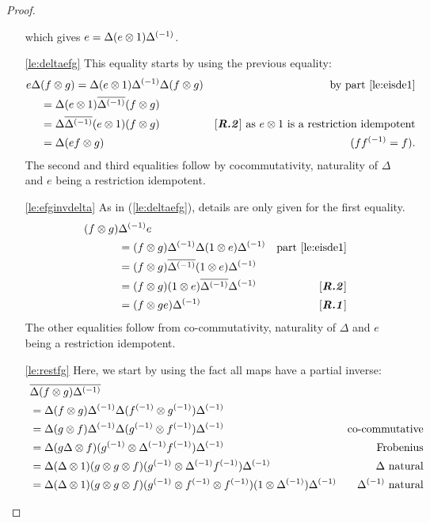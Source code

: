 \begin{proof}
\begin{enumerate}[{(}i{)}]
      which gives $e = \Delta (e \otimes 1) {\Delta}^{(-1)}$.
    \item[\vref{le:deltaefg}]This equality starts by using the previous equality:
      \begin{align*}
        e\Delta &(f \* g) = \Delta (e\* 1) \inv{\Delta} \Delta(f \* g) 
          &\text{by part \ref{le:eisde1}}\\
        &=\Delta(e  \* 1) \rst{\inv{\Delta}}(f\*g)&\\
        &=\Delta\rst{\inv{\Delta}}(e \*1)(f\*g)
          & \text{\rtwo as $e\*1$ is a restriction idempotent}\\
        &=\Delta (e f \* g) &\text{ ($f\inv{f} = f$)}.
      \end{align*}
      The second and third equalities follow by cocommutativity, naturality of $\Delta$ and $e$
      being a restriction idempotent.
    \item[\vref{le:efginvdelta}] As in (\vref{le:deltaefg}), details are only given for the 
      first equality.
      \begin{align*}
        (f \otimes g)&{\Delta}^{(-1)} e \\
        &= (f \otimes g) {\Delta}^{(-1)}\Delta (1\otimes e) {\Delta}^{(-1)}   &\text{part \ref{le:eisde1}}\\
        &=(f\otimes g)\overline{{\Delta}^{(-1)}}(1\otimes e) {\Delta}^{(-1)}&\\
        &=(f\otimes g)(1\otimes e) \overline{{\Delta}^{(-1)}}{\Delta}^{(-1)}&[\text{\emph{\bfseries {R}.{2}}}]\\
        &=(f\otimes g e){\Delta}^{(-1)}&[\text{\emph{\bfseries {R}.{1}}}]
      \end{align*}
      The other equalities follow from co-commutativity, naturality of $\Delta$ and $e$ being
      a restriction idempotent.
    \item[\vref{le:restfg}]Here, we start by using the fact all maps have a partial inverse:
      \begin{align*}
        ~&\restr{\Delta (f \* g) \inv{\Delta} } \\
        &=\Delta (f \* g) \inv{\Delta} \Delta (\inv{f} \* \inv{g}) \inv{\Delta} \\
        &=\Delta (g \* f) \inv{\Delta} \Delta (\inv{g} \* \inv{f}) \inv{\Delta}& \text{co-commutative} \\
        &=\Delta(g\Delta \*f)(\inv{g}\*\inv{\Delta}\inv{f})\inv{\Delta}&\text{Frobenius}\\
        &=\Delta (\Delta\*1)(g \* g \* f)(\inv{g}\*\inv{\Delta}\inv{f})\inv{\Delta}&\Delta \text{ natural}\\
        &=\Delta (\Delta\*1)(g \* g \* f)(\inv{g} \* \inv{f}\* \inv{f})(1\* \inv{\Delta})\inv{\Delta}&\inv{\Delta} \text{ natural}\\

\end{align*}
\end{enumerate}
\end{proof}
